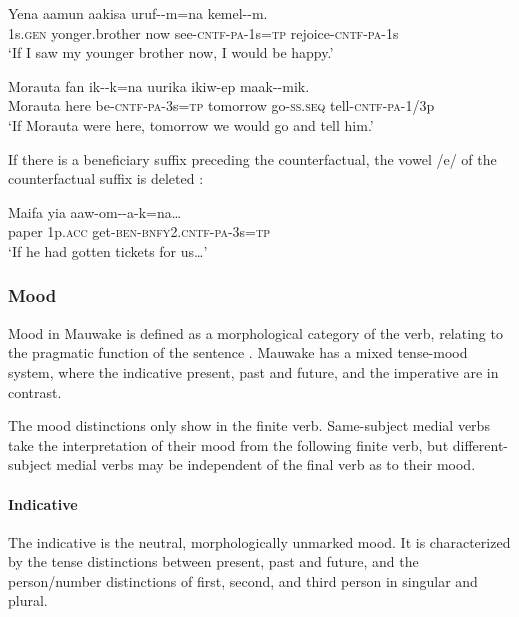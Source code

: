 \ea%
\label{ex:3:x433}
\gll Yena aamun aakisa uruf--m=na kemel--m. \\
1s.\textsc{gen} yonger.brother now see-\textsc{cntf}-\textsc{pa}-1s=\textsc{tp} rejoice-\textsc{cntf}-\textsc{pa}-1s\\
\glt`If I saw my younger brother now, I would be happy.'
\z

\ea%
\label{ex:3:x434}
\gll Morauta fan ik--k=na uurika ikiw-ep maak--mik.\\
Morauta here be-\textsc{cntf}-\textsc{pa}-3s=\textsc{tp} tomorrow go-\textsc{ss}.\textsc{seq} tell-\textsc{cntf}-\textsc{pa}-1/3p\\
\glt`If Morauta were here, tomorrow we would go and tell him.'
\z

If there is a beneficiary suffix  preceding the counterfactual, the vowel /e/ of the counterfactual suffix is deleted :

\ea%
\label{ex:3:x235}
\gll Maifa yia aaw-om--a-k=na{\dots} \\
paper 1p.\textsc{acc} get-\textsc{ben}-\textsc{bnfy}2.\textsc{cntf}-\textsc{pa}-3s=\textsc{tp} \\
\glt`If he had gotten tickets for us{\dots}'
\z

\subsubsection{Mood}\label{sec:3.8.3.3}
{}
Mood in Mauwake is defined as a morphological category of the verb, relating to the pragmatic function of the sentence \citep[cf.][21]{Palmer1986}. Mauwake has a mixed tense-mood system, where the indicative present, past and future, and the imperative are in contrast. 

The mood distinctions only show in the finite verb. Same-subject medial verbs take the interpretation of their mood from the following finite verb, but different-subject medial verbs may be independent of the final verb as to their mood.

\paragraph{Indicative}\label{sec:3:a:z:y:x}
{}
The indicative is the neutral, morphologically unmarked mood. It is characterized by the tense distinctions between present, past and future, and the person/number distinctions of first, second, and third person in singular and plural. 

